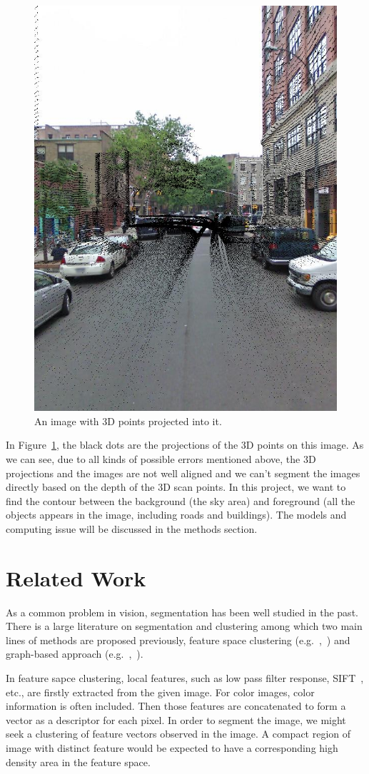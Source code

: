 \documentclass{article} %
\begin{document}
\begin{figure}[h]
\begin{center}
\includegraphics[height=0.5\linewidth]{./fig/overlay_00_00.jpg}
\end{center}
\caption{An image with 3D points projected into it.}
\label{fig-data_image}
\end{figure}

In Figure~\ref{fig-data_image}, the black dots are the projections of
the 3D points on this image. As we can see, due to all kinds of possible
errors mentioned above, the 3D projections and the images are not well
aligned and we can't segment the images directly based on the depth of
the 3D scan points. In this project, we want to find the contour
between the background (the sky area) and foreground (all the objects
appears in the image, including roads and buildings). The models and
computing issue will be discussed in the methods section.

\section{Related Work}
As a common problem in vision, segmentation has been well studied in the past. There is a large literature on segmentation and clustering among which two main lines of methods are proposed previously, feature space clustering (e.g.~\citep{Comaniciu1997featurespace},~\citep{Comaniciu1999meanshift}) and graph-based approach (e.g.~\citep{Shi1997normalizedcuts},~\citep{Wu1993optimalgraph}). 

In feature sapce clustering, local features, such as low pass filter response, SIFT~\citep{Lowe2004sift}, etc., are firstly extracted from the given image. For color images, color information is often included. Then those features are concatenated to form a vector as a descriptor for each pixel. In order to segment the image, we might seek a clustering of feature vectors observed in the image. A compact region of image with distinct feature would be expected to have a corresponding high density area in the feature space. 
\end{document}
